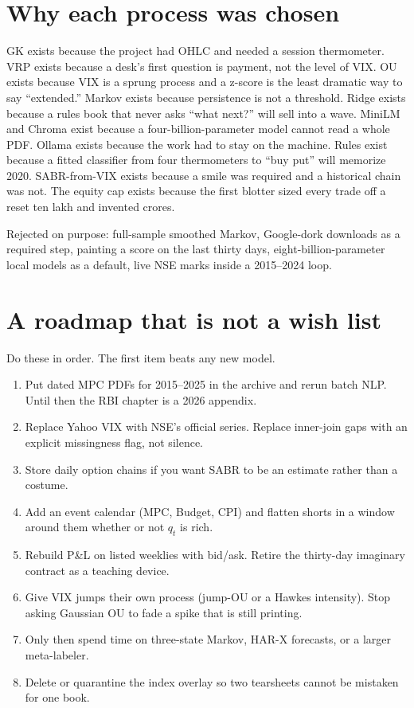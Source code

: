 \documentclass[11pt,a4paper]{article}
\begin{document}
\section{Why each process was chosen}
\label{ch:why}

GK exists because the project had OHLC and needed a session thermometer. VRP exists because a desk's first question is payment, not the level of VIX. OU exists because VIX is a sprung process and a z-score is the least dramatic way to say ``extended.'' Markov exists because persistence is not a threshold. Ridge exists because a rules book that never asks ``what next?'' will sell into a wave. MiniLM and Chroma exist because a four-billion-parameter model cannot read a whole PDF. Ollama exists because the work had to stay on the machine. Rules exist because a fitted classifier from four thermometers to ``buy put'' will memorize 2020. SABR-from-VIX exists because a smile was required and a historical chain was not. The equity cap exists because the first blotter sized every trade off a reset ten lakh and invented crores.

Rejected on purpose: full-sample smoothed Markov, Google-dork downloads as a required step, painting a score on the last thirty days, eight-billion-parameter local models as a default, live NSE marks inside a 2015--2024 loop.

\section{A roadmap that is not a wish list}
\label{ch:future}

Do these in order. The first item beats any new model.

\begin{enumerate}[leftmargin=1.3em]
  \item Put dated MPC PDFs for 2015--2025 in the archive and rerun batch NLP. Until then the RBI chapter is a 2026 appendix.
  \item Replace Yahoo VIX with NSE's official series. Replace inner-join gaps with an explicit missingness flag, not silence.
  \item Store daily option chains if you want SABR to be an estimate rather than a costume.
  \item Add an event calendar (MPC, Budget, CPI) and flatten shorts in a window around them whether or not $q_t$ is rich.
  \item Rebuild P\&L on listed weeklies with bid/ask. Retire the thirty-day imaginary contract as a teaching device.
  \item Give VIX jumps their own process (jump-OU or a Hawkes intensity). Stop asking Gaussian OU to fade a spike that is still printing.
  \item Only then spend time on three-state Markov, HAR-X forecasts, or a larger meta-labeler.
  \item Delete or quarantine the index overlay so two tearsheets cannot be mistaken for one book.
\end{enumerate}
\end{document}
